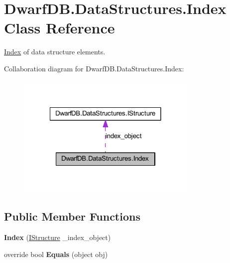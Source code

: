 \hypertarget{class_dwarf_d_b_1_1_data_structures_1_1_index}{
\section{DwarfDB.DataStructures.Index Class Reference}
\label{class_dwarf_d_b_1_1_data_structures_1_1_index}
}


\hyperlink{class_dwarf_d_b_1_1_data_structures_1_1_index}{Index} of data structure elements.  




Collaboration diagram for DwarfDB.DataStructures.Index:\nopagebreak
\begin{figure}[H]
\begin{center}
\leavevmode
\includegraphics[width=246pt]{class_dwarf_d_b_1_1_data_structures_1_1_index__coll__graph}
\end{center}
\end{figure}
\subsection*{Public Member Functions}
\begin{DoxyCompactItemize}
\item 
\hypertarget{class_dwarf_d_b_1_1_data_structures_1_1_index_a2481d361d4dbf7cb81f094a834b93214}{
{\bfseries Index} (\hyperlink{interface_dwarf_d_b_1_1_data_structures_1_1_i_structure}{IStructure} \_\-index\_\-object)}
\label{class_dwarf_d_b_1_1_data_structures_1_1_index_a2481d361d4dbf7cb81f094a834b93214}

\item 
\hypertarget{class_dwarf_d_b_1_1_data_structures_1_1_index_aef1cd3ec762c296c9ced22ab8ed4ab12}{
override bool {\bfseries Equals} (object obj)}
\label{class_dwarf_d_b_1_1_data_structures_1_1_index_aef1cd3ec762c296c9ced22ab8ed4ab12}

\end{DoxyCompactItemize}
